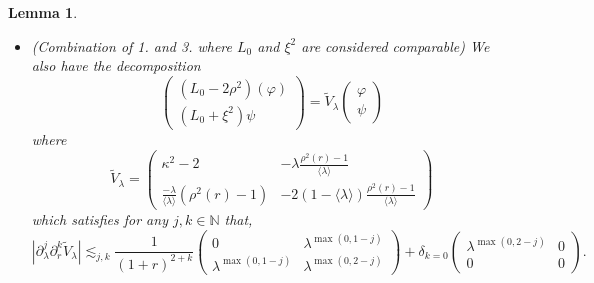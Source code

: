 \documentclass[11 pt]{amsart}
\newtheorem{lem}{Lemma}[section]
\theoremstyle{definition}
\theoremstyle{remark}
\numberwithin{equation}{section}
\begin{document}
\begin{lem}
\begin{itemize}
\item[4)] (Combination of 1. and 3. where $L_0$ and $\xi^2$ are considered comparable) We
  also have the decomposition
  \[ \left(\begin{array}{c}
       (L_0 - 2 \rho^2) (\varphi)\\
       (L_0 + \xi^2) \psi
     \end{array}\right) = \widetilde{V}_{\lambda} \left(\begin{array}{c}
       \varphi\\
       \psi
     \end{array}\right) \]
  where
  \[ \widetilde{V}_{\lambda} = \left(\begin{array}{cc}
       \kappa^2 - 2 & - \lambda \frac{\rho^2 (r) - 1}{\langle \lambda
       \rangle}\\
       \frac{- \lambda}{\langle \lambda \rangle} (\rho^2 (r) - 1) & - 2 (1 -
       \langle \lambda \rangle) \frac{\rho^2 (r) - 1}{\langle \lambda \rangle}
     \end{array}\right) \]
  which satisfies for any $j, k \in \mathbb{N}$ that,
  \[ | \partial_{\lambda}^j \partial_r^k \widetilde{V}_{\lambda} | \lesssim_{j, k}
     \frac{1}{(1 + r)^{2 + k}} \left(\begin{array}{cc}
       0 & \lambda^{\max (0, 1 - j)}\\
       \lambda^{\max (0, 1 - j)} & \lambda^{\max (0, 2 - j)}
     \end{array}\right) + \delta_{k = 0} \left(\begin{array}{cc}
       \lambda^{\max (0, 2 - j)} & 0\\
       0 & 0
     \end{array}\right) . \]
\end{itemize}
\end{lem}
\end{document}
